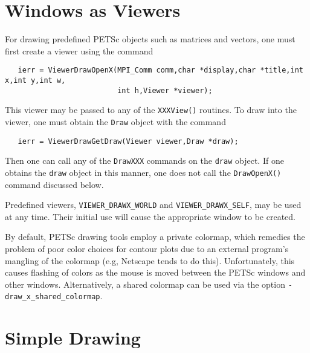 \section{Windows as Viewers}
For drawing predefined PETSc objects such as matrices and vectors, one must 
first create a viewer using the 
command 
\begin{verbatim}
   ierr = ViewerDrawOpenX(MPI_Comm comm,char *display,char *title,int x,int y,int w,
                          int h,Viewer *viewer);
\end{verbatim}
This viewer may be passed to any of the {\tt XXXView()} routines.
To draw into the viewer, one must obtain the {\tt Draw} object with the
command 
\begin{verbatim}
   ierr = ViewerDrawGetDraw(Viewer viewer,Draw *draw);
\end{verbatim}
Then one can call any of the {\tt DrawXXX} commands on the {\tt draw}
object. If one obtains the {\tt draw} object in this manner, 
one does not call the {\tt DrawOpenX()} command discussed below.

  
Predefined viewers, {\tt VIEWER\_DRAWX\_WORLD} 
and {\tt VIEWER\_DRAWX\_SELF}, may be used at any time. Their initial
use will cause the appropriate window to be created.

\medskip
By default, PETSc drawing tools employ a private colormap,
which remedies the problem of poor color choices for contour plots due
to an external program's mangling of the colormap (e.g, Netscape tends
to do this).
Unfortunately, this causes flashing of colors as the mouse is moved
between the PETSc windows and other windows.  Alternatively, a shared
colormap can be used via the option {\tt -draw\_x\_shared\_colormap}.

\section{Simple Drawing}

